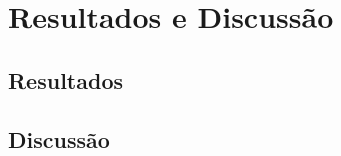 \chapter{Resultados e Discussão}
\label{chapter:trabalhoexperimental}
\lipsum[2]

\section{Resultados}
\label{section:titulo43}
\lipsum[1]

\section{Discuss\~ao}
\label{section:titulo4N}
\lipsum[5]